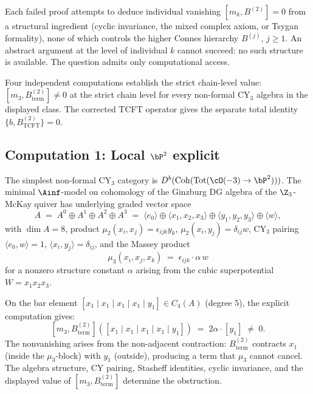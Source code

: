 Each failed proof attempts to deduce individual vanishing
$[m_k, B^{(2)}] = 0$ from a structural ingredient (cyclic
invariance, the mixed complex axiom, or Tsygan formality),
none of which controls the higher Connes hierarchy
$B^{(j)}$, $j \geq 1$. An abstract argument at the level of
individual $k$ cannot succeed: no such structure is available.
The question admits only computational access.

Four independent computations establish the strict chain-level value:
$[m_3, B^{(2)}_{\mathrm{term}}] \neq 0$ at the strict chain
level for every non-formal CY$_3$ algebra in the displayed class.
The corrected TCFT operator gives the separate total identity
$\{b, B^{(2)}_{\mathrm{TCFT}}\}=0$.


\subsection{Computation 1: Local \texorpdfstring{$\bP^2$}{P-2} explicit}
\label{subsec:comp-local-p2}

\begin{computation}
\label{comp:local-p2-m3b2}
The simplest non-formal CY$_3$ category is
$D^b(\mathrm{Coh}(\mathrm{Tot}(\cO(-3) \to \bP^2)))$.
The minimal $\Ainf$-model on cohomology of the Ginzburg DG algebra
of the $\Z_3$-McKay quiver has underlying graded vector space
\[
 A \;=\; A^0 \oplus A^1 \oplus A^2 \oplus A^3
 \;=\; \langle e_0 \rangle \oplus \langle x_1, x_2, x_3 \rangle
 \oplus \langle y_1, y_2, y_3 \rangle \oplus \langle w \rangle,
\]
with $\dim A = 8$, product
$\mu_2(x_i, x_j) = \epsilon_{ijk} y_k$,
$\mu_2(x_i, y_j) = \delta_{ij} w$, CY$_3$ pairing
$\langle e_0, w \rangle = 1$,
$\langle x_i, y_j \rangle = \delta_{ij}$, and the
Massey product
\[
 \mu_3(x_i, x_j, x_k) \;=\; \epsilon_{ijk} \cdot \alpha \, w
\]
for a nonzero structure constant $\alpha$ arising from the cubic
superpotential $W = x_1 x_2 x_3$.

On the bar element $[x_1 \mid x_1 \mid x_1 \mid x_1 \mid y_1]
\in C_4(A)$ \textup{(}degree $5$\textup{)}, the explicit
computation gives:
\[
 [m_3, B^{(2)}_{\mathrm{term}}]([x_1 \mid x_1 \mid x_1 \mid x_1 \mid y_1])
 \;=\; 2\alpha \cdot [y_1] \;\neq\; 0.
\]
The nonvanishing arises from the non-adjacent contraction:
$B^{(2)}_{\mathrm{term}}$ contracts $x_1$ (inside the $\mu_3$-block) with $y_1$
(outside), producing a term that $\mu_3$ cannot cancel.
The algebra structure, CY pairing, Stasheff identities, cyclic
invariance, and the displayed value of
$[m_3, B^{(2)}_{\mathrm{term}}]$ determine the obstruction.
\end{computation}

